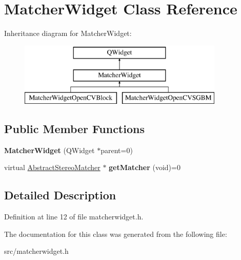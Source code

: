 \hypertarget{class_matcher_widget}{}\section{Matcher\+Widget Class Reference}
\label{class_matcher_widget}
Inheritance diagram for Matcher\+Widget\+:\begin{figure}[H]
\begin{center}
\leavevmode
\includegraphics[height=3.000000cm]{class_matcher_widget}
\end{center}
\end{figure}
\subsection*{Public Member Functions}
\begin{DoxyCompactItemize}
\item 
\hypertarget{class_matcher_widget_a2200fa2bb5a1bffcc4552f63ca1bdb5d}{}{\bfseries Matcher\+Widget} (Q\+Widget $\ast$parent=0)\label{class_matcher_widget_a2200fa2bb5a1bffcc4552f63ca1bdb5d}

\item 
\hypertarget{class_matcher_widget_ab288c58c635180941360691cfde3e677}{}virtual \hyperlink{class_abstract_stereo_matcher}{Abstract\+Stereo\+Matcher} $\ast$ {\bfseries get\+Matcher} (void)=0\label{class_matcher_widget_ab288c58c635180941360691cfde3e677}

\end{DoxyCompactItemize}


\subsection{Detailed Description}


Definition at line 12 of file matcherwidget.\+h.



The documentation for this class was generated from the following file\+:\begin{DoxyCompactItemize}
\item 
src/matcherwidget.\+h\end{DoxyCompactItemize}
